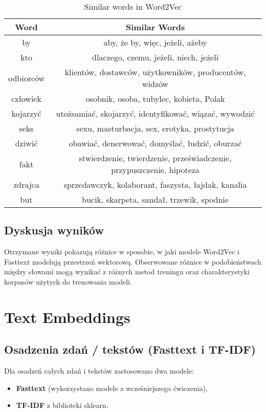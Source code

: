 \documentclass[12pt]{article}
\begin{document}
\begin{table}[h!]
\centering
\begin{tabular}{|c|c|}
\hline
\textbf{Word} & \textbf{Similar Words} \\
\hline
by & aby, że by, więc, jeżeli, ażeby \\
\hline
kto & dlaczego, czemu, jeżeli, niech, jeżeli \\
\hline
odbiorców & klientów, dostawców, użytkowników, producentów, widzów \\
\hline
człowiek & osobnik, osoba, tubylec, kobieta, Polak \\
\hline
kojarzyć & utożsamiać, skojarzyć, identyfikować, wiązać, wywodzić \\
\hline
seks & sexu, masturbacja, sex, erotyka, prostytucja \\
\hline
dziwić & obawiać, denerwować, domyślać, łudzić, oburzać \\
\hline
fakt & stwierdzenie, twierdzenie, przeświadczenie, przypuszczenie, hipoteza \\
\hline
zdrajca & sprzedawczyk, kolaborant, faszysta, łajdak, kanalia \\
\hline
but & bucik, skarpeta, sandał, trzewik, spodnie \\
\hline
\end{tabular}
\caption{Similar words in Word2Vec}
\end{table}

\subsection{Dyskusja wyników}
Otrzymane wyniki pokazują różnice w sposobie, w jaki modele Word2Vec i Fasttext modelują przestrzeń wektorową. Obserwowane różnice w podobieństwach między słowami mogą wynikać z różnych metod treningu oraz charakterystyki korpusów użytych do trenowania modeli.

\section{Text Embeddings}

\subsection{Osadzenia zdań / tekstów (Fasttext i TF-IDF)}
Dla osadzeń całych zdań i tekstów zastosowano dwa modele:
\begin{itemize}
    \item \textbf{Fasttext} (wykorzystano modele z wcześniejszego ćwiczenia),
    \item \textbf{TF-IDF} z biblioteki sklearn.
\end{itemize}
\end{document}
